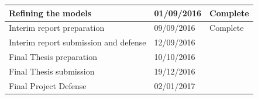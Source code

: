 \documentclass[12pt]{article}
\begin{document}
\begin{table}[]
\begin{tabular}{|l|l|l|}
Refining the models                            & 01/09/2016      & Complete \\ \hline
Interim report preparation                     & 09/09/2016      & Complete \\ \hline
Interim report submission and defense          & 12/09/2016      &          \\ \hline
Final Thesis preparation                       & 10/10/2016      &          \\ \hline
Final Thesis submission                        & 19/12/2016      &          \\ \hline
Final Project Defense                          & 02/01/2017      &          \\ \hline
\end{tabular}
\end{table}
\clearpage 
\end{document}
